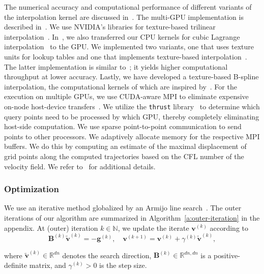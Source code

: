 \documentclass[11pt]{amsart}
\newcommand{\algref}[1]{Algorithm~\ref{#1}}
\newcommand\di[1]{\ensuremath{\mathbf{#1}}}
\begin{document}
The numerical accuracy and computational performance of different variants of the interpolation kernel are discussed in~\cite{Brunn:2021a}. The multi-GPU implementation is described in~\cite{Brunn:2020a}. We use NVIDIA's libraries for texture-based trilinear interpolation~\cite{Sigg:2005a}. In~\cite{Brunn:2021a}, we also transferred our CPU kernels for cubic Lagrange interpolation~\cite{Mang:2016a,Gholami:2017a,Mang:2019a} to the GPU. We implemented two variants, one that uses texture units for lookup tables and one that implements texture-based interpolation~\cite{Brunn:2021a}. The latter implementation is similar to~\cite{Ruijters:2008a}; it yields higher computational throughput at lower accuracy. Lastly, we have developed a texture-based B-spline interpolation, the computational kernels of which are inspired by~\cite{Ruijters:2008a,Guijters:2012a,Champagnat:2012a}. For the execution on multiple GPUs, we use CUDA-aware MPI to eliminate expensive on-node host-device transfers~\cite{Brunn:2020a}. We utilize the \texttt{thrust} library~\cite{thrustweb} to determine which query points need to be processed by which GPU, thereby completely eliminating host-side computation. We use sparse point-to-point communication to send points to other processors. We adaptively allocate memory for the respective MPI buffers. We do this by computing an estimate of the maximal displacement of grid points along the computed trajectories based on the CFL number of the velocity field. We refer to~\cite{Brunn:2020a,Brunn:2021a} for additional details.




\subsubsection{Optimization}\label{s:optimization}

We use an iterative method globalized by an Armijo line search~\cite{Nocedal:2006a,Boyd:2004a}. The outer iterations of our algorithm are summarized in \algref{a:outer-iteration} in the appendix. At (outer) iteration $k \in \mathbb{N}$, we update the iterate $\di{v}^{(k)} $ according to
\[
\di{B}^{(k)} \di{\tilde{v}}^{(k)} = -\di{g}^{(k)}, \quad
\di{v}^{(k+1)} = \di{v}^{(k)} + \gamma^{(k)} \di{\tilde{v}}^{(k)},
\]

\noindent where $\di{\tilde{v}}^{(k)} \in \mathbb{R}^{dn}$ denotes the search direction, $\di{B}^{(k)} \in \mathbb{R}^{dn,dn}$ is a positive-definite matrix, and $\gamma^{(k)} > 0$ is the step size.
\end{document}
